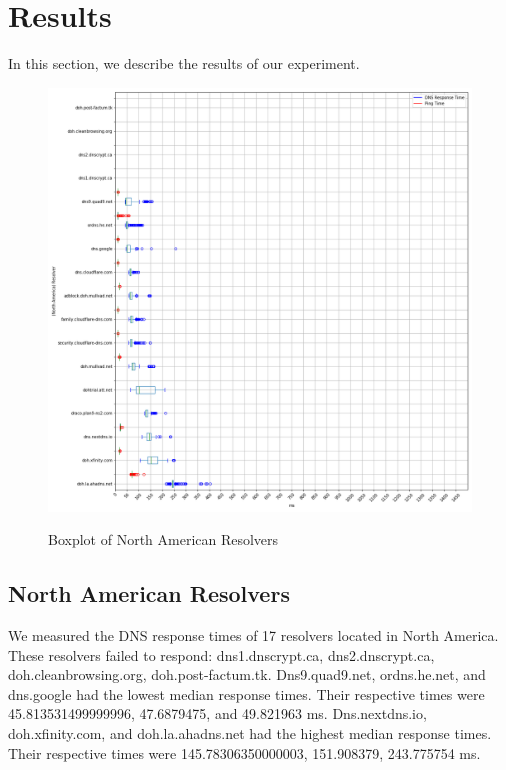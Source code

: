 \section{Results}\label{sec:results}
In this section, we describe the results of our experiment. 

\begin{figure}
    \includegraphics[width=\textwidth]{figures/100_North_America.png}
    \label{fig:NAPlots}
    \caption{Boxplot of North American Resolvers}
\end{figure}

\subsection{North American Resolvers}
We measured the DNS response times of 17 resolvers located in North America. 
These resolvers failed to respond: dns1.dnscrypt.ca, dns2.dnscrypt.ca, doh.cleanbrowsing.org, doh.post-factum.tk.
Dns9.quad9.net, ordns.he.net, and dns.google had the lowest median response times.
Their respective times were 45.813531499999996, 47.6879475, and 49.821963 ms. 
Dns.nextdns.io, doh.xfinity.com, and doh.la.ahadns.net had the highest median response times. 
Their respective times were 145.78306350000003, 151.908379, 243.775754 ms. 


